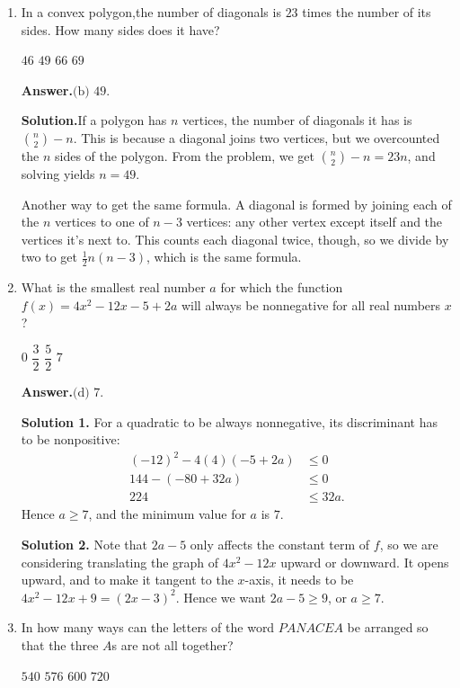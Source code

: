 \documentclass[11pt,paper=letter]{scrartcl}
\newcommand{\ansb}[2]{{\sffamily \bfseries Answer.}\;\(\boxed{\text{(#1) #2}}\).}
\newcommand{\sol}{{\sffamily \bfseries Solution.}\;}
\newcommand{\soln}[1]{{\sffamily \bfseries Solution #1.}\;}
\newenvironment{rem}%
{\noindent \ignorespaces \small \sffamily \sansmath {\bfseries Remark.}}%
{\ignorespacesafterend}
\begin{document}
\begin{enumerate}[align=left,leftmargin=*]

\item In a convex polygon,the number of diagonals is $23$ times the number of its sides. How many sides does it have?

\fourch
{$46$}
{$49$}
{$66$}
{$69$}

\ansb{b}{$49$}

\sol If a polygon has $n$ vertices, the number of diagonals it has is $\binom{n}{2} - n$. This is because a diagonal joins two vertices, but we overcounted the $n$ sides of the polygon. From the problem, we get $\binom{n}{2} - n = 23n$, and solving yields $n = 49$.

\begin{rem}
Another way to get the same formula. A diagonal is formed by joining each of the $n$ vertices to one of $n - 3$ vertices: any other vertex except itself and the vertices it's next to. This counts each diagonal twice, though, so we divide by two to get $\frac{1}{2}n(n-3)$, which is the same formula.
\end{rem}

\item What is the smallest real number $a$ for which the function $f(x) = 4x^2 - 12x - 5 + 2a$ will always be nonnegative for all real numbers $x$?

\fourch
{$0$}
{$\dfrac{3}{2}$}
{$\dfrac{5}{2}$}
{$7$}

\ansb{d}{$7$}

\soln1 For a quadratic to be always nonnegative, its discriminant has to be nonpositive:
\begin{align*}
(-12)^2 - 4(4)(-5 + 2a) &\le 0 \\
144 - (-80 + 32a) &\le 0 \\
224 &\le 32a.
\end{align*}
Hence $a \ge 7$, and the minimum value for $a$ is $7$.

\soln2 Note that $2a - 5$ only affects the constant term of $f$, so we are considering translating the graph of $4x^2 - 12x$ upward or downward. It opens upward, and to make it tangent to the $x$-axis, it needs to be $4x^2 - 12x + 9 = (2x - 3)^2$. Hence we want $2a - 5 \ge 9$, or $a \ge 7$.

\item In how many ways can the letters of the word $PANACEA$ be arranged so that the three $A$s are not all together?

\fourch
{$540$}
{$576$}
{$600$}
{$720$}


\end{enumerate}
\end{document}
